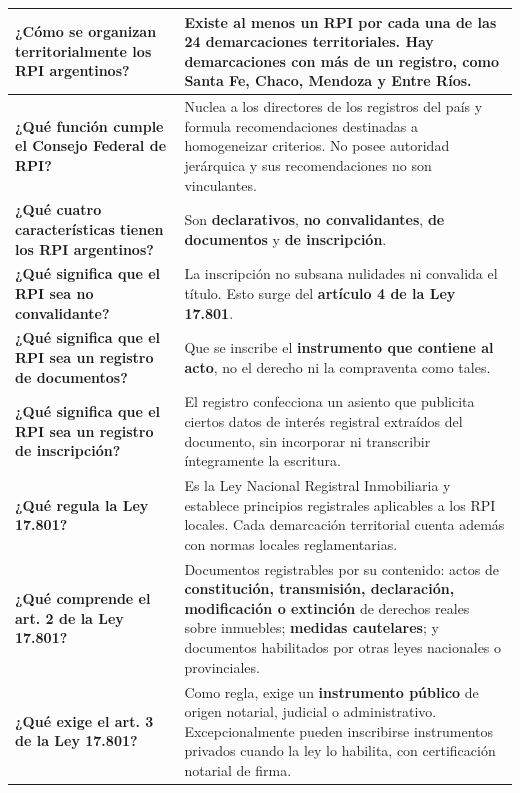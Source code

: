 \documentclass[12pt,oneside]{book}
\begin{document}
\begin{longtable}{|>{\raggedright\arraybackslash}p{}|>{\raggedright\arraybackslash}p{}|}
\textbf{¿Cómo se organizan territorialmente los RPI argentinos?} &
Existe al menos un RPI por cada una de las 24 demarcaciones territoriales. Hay demarcaciones con más de un registro, como Santa Fe, Chaco, Mendoza y Entre Ríos. \\
\hline

\textbf{¿Qué función cumple el Consejo Federal de RPI?} &
Nuclea a los directores de los registros del país y formula recomendaciones destinadas a homogeneizar criterios. No posee autoridad jerárquica y sus recomendaciones no son vinculantes. \\
\hline

\textbf{¿Qué cuatro características tienen los RPI argentinos?} &
Son \textbf{declarativos}, \textbf{no convalidantes}, \textbf{de documentos} y \textbf{de inscripción}. \\
\hline

\textbf{¿Qué significa que el RPI sea no convalidante?} &
La inscripción no subsana nulidades ni convalida el título. Esto surge del \textbf{artículo 4 de la Ley 17.801}. \\
\hline

\textbf{¿Qué significa que el RPI sea un registro de documentos?} &
Que se inscribe el \textbf{instrumento que contiene al acto}, no el derecho ni la compraventa como tales. \\
\hline

\textbf{¿Qué significa que el RPI sea un registro de inscripción?} &
El registro confecciona un asiento que publicita ciertos datos de interés registral extraídos del documento, sin incorporar ni transcribir íntegramente la escritura. \\
\hline

\textbf{¿Qué regula la Ley 17.801?} &
Es la Ley Nacional Registral Inmobiliaria y establece principios registrales aplicables a los RPI locales. Cada demarcación territorial cuenta además con normas locales reglamentarias. \\
\hline

\textbf{¿Qué comprende el art. 2 de la Ley 17.801?} &
Documentos registrables por su contenido: actos de \textbf{constitución, transmisión, declaración, modificación o extinción} de derechos reales sobre inmuebles; \textbf{medidas cautelares}; y documentos habilitados por otras leyes nacionales o provinciales. \\
\hline

\textbf{¿Qué exige el art. 3 de la Ley 17.801?} &
Como regla, exige un \textbf{instrumento público} de origen notarial, judicial o administrativo. Excepcionalmente pueden inscribirse instrumentos privados cuando la ley lo habilita, con certificación notarial de firma. \\
\hline


\end{longtable}
\end{document}
